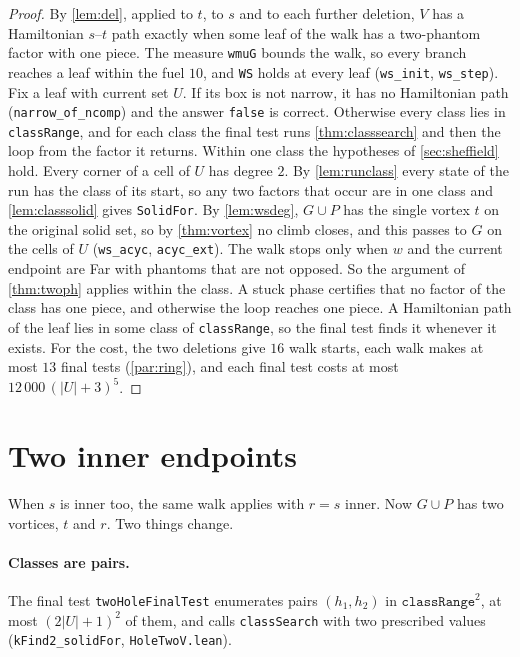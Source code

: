 \documentclass[11pt]{article}
\theoremstyle{plain}
\theoremstyle{definition}
\theoremstyle{remark}
\newcommand{\lean}[1]{\texttt{#1}}
\begin{document}
\begin{proof}
By \cref{lem:del}, applied to $t$, to $s$ and to each further deletion, $V$ has a Hamiltonian
$s$--$t$ path exactly when some leaf of the walk has a two-phantom factor with one piece.
The measure \lean{wmuG} bounds the walk, so every branch reaches a leaf within the fuel $10$, and
\lean{WS} holds at every leaf (\lean{ws\_init}, \lean{ws\_step}).
Fix a leaf with current set $U$.
If its box is not narrow, it has no Hamiltonian path (\lean{narrow\_of\_ncomp}) and the answer
\lean{false} is correct.
Otherwise every class lies in \lean{classRange}, and for each class the final test runs
\cref{thm:classsearch} and then the loop from the factor it returns.
Within one class the hypotheses of \cref{sec:sheffield} hold.
Every corner of a cell of $U$ has degree $2$.
By \cref{lem:runclass} every state of the run has the class of its start, so any two factors that
occur are in one class and \cref{lem:classsolid} gives \lean{SolidFor}.
By \cref{lem:wsdeg}, $G\cup P$ has the single vortex $t$ on the original solid set, so by
\cref{thm:vortex} no climb closes, and this passes to $G$ on the cells of $U$ (\lean{ws\_acyc},
\lean{acyc\_ext}).
The walk stops only when $w$ and the current endpoint are Far with phantoms that are not opposed.
So the argument of \cref{thm:twoph} applies within the class.
A stuck phase certifies that no factor of the class has one piece, and otherwise the loop reaches
one piece.
A Hamiltonian path of the leaf lies in some class of \lean{classRange}, so the final test finds it
whenever it exists.
For the cost, the two deletions give $16$ walk starts, each walk makes at most $13$ final tests
(\cref{par:ring}), and each final test costs at most $12\,000\,(|U|+3)^5$.
\end{proof}

\section{Two inner endpoints}
\label{sec:two}

When $s$ is inner too, the same walk applies with $r=s$ inner.
Now $G\cup P$ has two vortices, $t$ and $r$.
Two things change.

\paragraph{Classes are pairs.}
The final test \lean{twoHoleFinalTest} enumerates pairs $(h_1,h_2)$ in $\lean{classRange}^2$, at most
$(2|U|+1)^2$ of them, and calls \lean{classSearch} with two prescribed values
(\lean{kFind2\_solidFor}, \lean{HoleTwoV.lean}).
\end{document}
